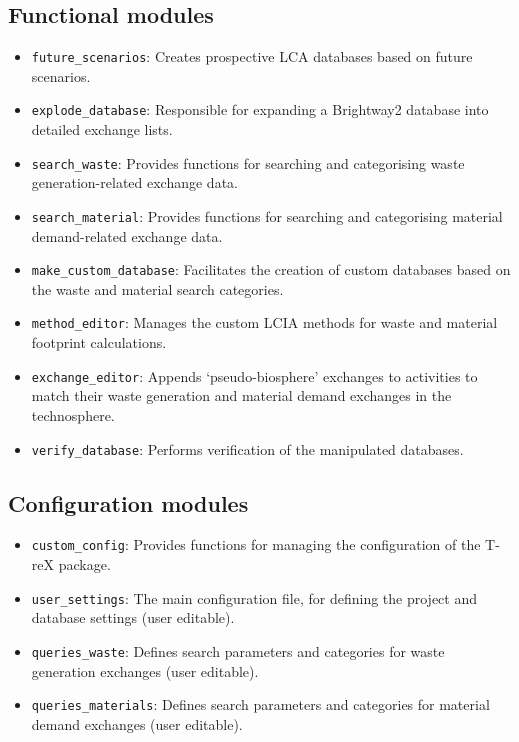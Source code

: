 \documentclass{article}
\renewcommand{\texttt}[1]{{\ttfamily\small\nolinkurl{#1}}}
\begin{document}
\subsection{Functional modules}
\begin{itemize}
    \item \texttt{future\_scenarios}: Creates prospective LCA databases based on future scenarios.
    \item \texttt{explode\_database}: Responsible for expanding a Brightway2 database into detailed exchange lists.
    \item \texttt{search\_waste}: Provides functions for searching and categorising waste generation-related exchange data.
    \item \texttt{search\_material}: Provides functions for searching and categorising material demand-related exchange data.
    \item \texttt{make\_custom\_database}: Facilitates the creation of custom databases based on the waste and material search categories.
    \item \texttt{method\_editor}: Manages the custom LCIA methods for waste and material footprint calculations.
    \item \texttt{exchange\_editor}: Appends `pseudo-biosphere' exchanges to activities to match their waste generation and material demand exchanges in the technosphere.
    \item \texttt{verify\_database}: Performs verification of the manipulated databases.
\end{itemize}

\subsection{Configuration modules}
\begin{itemize}
    \item \texttt{custom\_config}: Provides functions for managing the configuration of the T-reX package.
    \item \texttt{user\_settings}: The main configuration file, for defining the project and database settings (user editable).
    \item \texttt{queries\_waste}: Defines search parameters and categories for waste generation exchanges (user editable).
    \item \texttt{queries\_materials}: Defines search parameters and categories for material demand exchanges (user editable).
\end{itemize}
\end{document}
